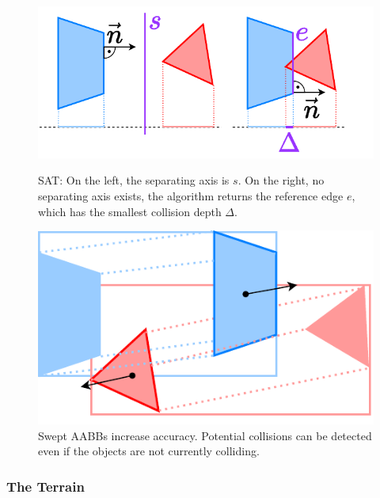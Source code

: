 \begin{figure}[htbp]
  \centering
  \begin{minipage}{.53\linewidth}
    \centering
    \includegraphics[width=1.09\linewidth]{figures/physics/sat.pdf}
    \caption{SAT: On the left, the separating axis is $s$. On the right, no separating axis exists, the algorithm returns the reference edge $e$, which has the smallest collision depth $\Delta$.}
    \label{fig:SAT}
  \end{minipage}\hspace{.04\linewidth}%
  \begin{minipage}{.43\linewidth}
    \centering
    \includegraphics[width=\linewidth]{figures/physics/aabb.pdf}
    \caption{Swept AABBs increase accuracy. Potential collisions can be detected even if the objects are not currently colliding.}
    \label{fig:aabb}
  \end{minipage}
\end{figure}
\vspace{-\abovedisplayskip}

\subsubsection{The Terrain}\label{sec:terrainCD}

